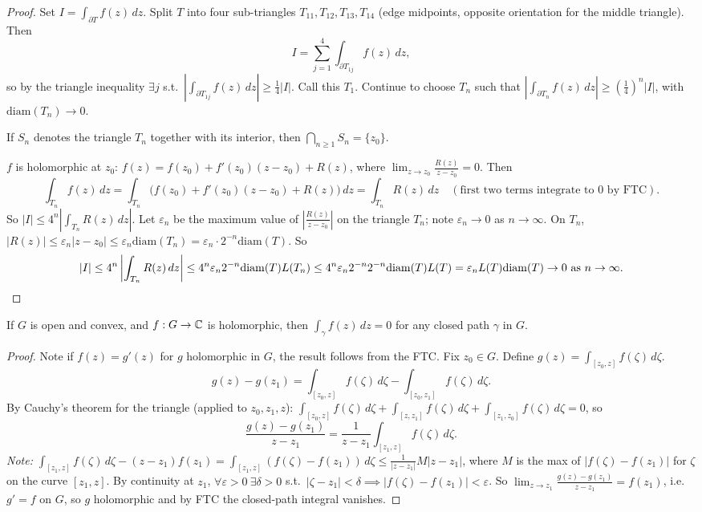 \documentclass[11pt]{article}
\begin{document}
\begin{proof}
Set $I = \int_{\partial T} f(z)\,dz$. Split $T$ into four sub-triangles $T_{11},T_{12},T_{13},T_{14}$ (edge midpoints, opposite orientation for the middle triangle). Then
\[
I = \sum_{j=1}^4 \int_{\partial T_{1j}} f(z)\,dz,
\]
so by the triangle inequality $\exists j$ s.t.\ $\left|\int_{\partial T_{1j}} f(z)\,dz\right| \ge \frac{1}{4}|I|$. Call this $T_1$. Continue to choose $T_n$ such that $\left|\int_{\partial T_n} f(z)\,dz\right| \ge \left(\frac{1}{4}\right)^n |I|$, with $\mathrm{diam}(T_n) \to 0$.

If $S_n$ denotes the triangle $T_n$ together with its interior, then $\bigcap_{n\ge1} S_n = \{z_0\}$.

$f$ is holomorphic at $z_0$: $f(z) = f(z_0) + f'(z_0)(z-z_0) + R(z)$, where $\lim_{z\to z_0}\frac{R(z)}{z-z_0}=0$. Then
\[
\int_{T_n} f(z)\,dz = \int_{T_n}\big(f(z_0) + f'(z_0)(z-z_0)+R(z)\big)\,dz = \int_{T_n} R(z)\,dz \quad (\text{first two terms integrate to } 0 \text{ by FTC}).
\]
So $|I| \le 4^n\left|\int_{T_n} R(z)\,dz\right|$. Let $\varepsilon_n$ be the maximum value of $\left|\frac{R(z)}{z-z_0}\right|$ on the triangle $T_n$; note $\varepsilon_n \to 0$ as $n\to\infty$. On $T_n$, $|R(z)| \le \varepsilon_n|z-z_0| \le \varepsilon_n \mathrm{diam}(T_n) = \varepsilon_n\cdot 2^{-n}\mathrm{diam}(T)$. So
\[
|I| \le 4^n\left|\int_{T_n} R(z)\,dz\right| \le 4^n\varepsilon_n2^{-n}\mathrm{diam}(T)L(T_n) \le 4^n\varepsilon_n2^{-n}2^{-n}\mathrm{diam}(T)L(T) = \varepsilon_nL(T)\mathrm{diam}(T) \to 0 \text{ as } n\to\infty. \qedhere
\]
\end{proof}

\begin{theorem}
If $G$ is open and convex, and $f: G \to {\mathbb{C}}$ is holomorphic, then $\int_\gamma f(z) \, dz = 0$ for any closed path $\gamma$ in $G$.
\end{theorem}

\begin{proof}
Note if $f(z)=g'(z)$ for $g$ holomorphic in $G$, the result follows from the FTC.
Fix $z_0\in G$. Define $g(z) = \int_{[z_0,z]} f(\zeta)\,d\zeta$.
\[
g(z)-g(z_1) = \int_{[z_0,z]} f(\zeta)\,d\zeta - \int_{[z_0,z_1]} f(\zeta)\,d\zeta.
\]
By Cauchy's theorem for the triangle (applied to $z_0,z_1,z$): $\int_{[z_0,z]}f(\zeta)\,d\zeta + \int_{[z,z_1]}f(\zeta)\,d\zeta + \int_{[z_1,z_0]}f(\zeta)\,d\zeta = 0$, so
\[
\frac{g(z)-g(z_1)}{z-z_1} = \frac{1}{z-z_1}\int_{[z_1,z]}f(\zeta)\,d\zeta.
\]
\emph{Note:} $\int_{[z_1,z]}f(\zeta)\,d\zeta - (z-z_1)f(z_1) = \int_{[z_1,z]}(f(\zeta)-f(z_1))\,d\zeta \le \frac{1}{|z-z_1|}M|z-z_1|$, where $M$ is the max of $|f(\zeta)-f(z_1)|$ for $\zeta$ on the curve $[z_1,z]$. By continuity at $z_1$, $\forall \varepsilon>0\ \exists \delta>0$ s.t.\ $|\zeta-z_1|<\delta \implies |f(\zeta)-f(z_1)|<\varepsilon$. So $\lim_{z\to z_1}\frac{g(z)-g(z_1)}{z-z_1}=f(z_1)$, i.e.\ $g'=f$ on $G$, so $g$ holomorphic and by FTC the closed-path integral vanishes.
\end{proof}
\end{document}
